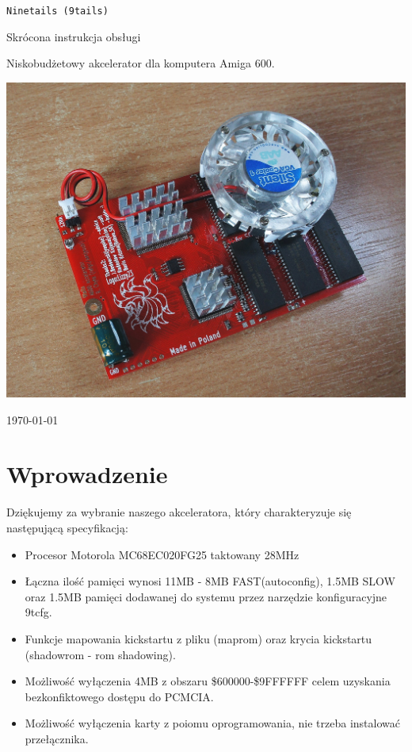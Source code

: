 \documentclass[10pt,a5paper]{article}
\begin{document}
\begin{titlepage}
\begin{center}

\huge
{\tt Ninetails (9tails)}

\Large
Skrócona instrukcja obsługi

\vspace*{2cm}

\normalsize
Niskobudżetowy akcelerator dla komputera Amiga 600.

\vspace*{2cm}
\includegraphics[scale=1]{ninetails-photo.jpg}
\vfill

\normalsize
\today

\end{center}
\end{titlepage}

\section*{Wprowadzenie}

Dziękujemy za wybranie naszego akceleratora, który charakteryzuje się następującą specyfikacją:

\begin{itemize}\itemsep0pt
	\item Procesor Motorola MC68EC020FG25 taktowany 28MHz
	\item Łączna ilość pamięci wynosi 11MB - 8MB FAST(autoconfig), 1.5MB SLOW oraz 1.5MB pamięci dodawanej do systemu przez narzędzie konfiguracyjne 9tcfg.
	\item Funkcje mapowania kickstartu z pliku (maprom) oraz krycia kickstartu (shadowrom - rom shadowing).
	\item Możliwość wyłączenia 4MB z obszaru \$600000-\$9FFFFFF celem uzyskania bezkonfiktowego dostępu do PCMCIA.
	\item Możliwość wyłączenia karty z poiomu oprogramowania, nie trzeba instalować przełącznika.
\end{itemize}
\end{document}
